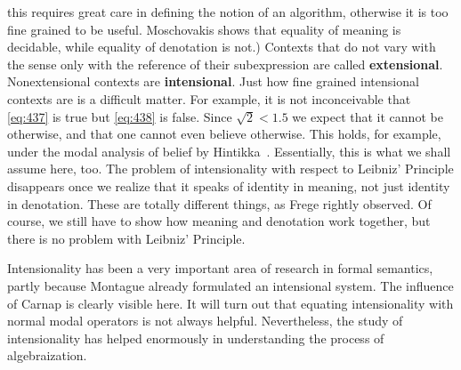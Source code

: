 this requires great care in defining the notion of an algorithm,
otherwise it is too fine grained to be useful. Moschovakis shows 
that equality of meaning is decidable, while equality of denotation 
is not.) Contexts that do not vary with the sense only with the 
reference of their subexpression are called \textbf{extensional}.  
Nonextensional contexts are \textbf{intensional}.
Just how fine grained intensional contexts are is a difficult matter.
For example, it is not inconceivable that \eqref{eq:437} is true but 
\eqref{eq:438} is false. Since $\sqrt{2} < 1.5$ we expect that it 
cannot be otherwise, and that one cannot even believe otherwise. 
This holds, for example, under the modal analysis of belief by 
Hintikka~. Essentially, this is what 
we shall assume here, too. The problem of intensionality with 
respect to Leibniz' Principle disappears once we realize that it 
speaks of identity in meaning, not just identity in
denotation. These are totally different things, as Frege rightly
observed. Of course, we still have to show how meaning and
denotation work together, but there is no problem with Leibniz'
Principle.

Intensionality has been a very important area of research in
formal semantics, partly because Montague 
already formulated
an intensional system. The influence of Carnap is clearly
visible here. It will turn out that equating intensionality
with normal modal operators is not always helpful. Nevertheless,
the study of intensionality has helped enormously in understanding
the process of algebraization.

